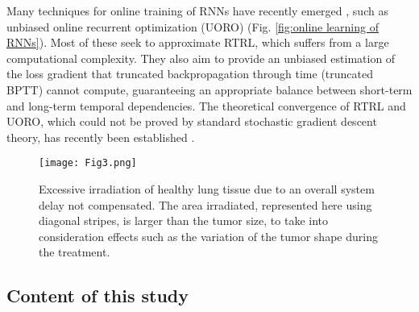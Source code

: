 \documentclass[twocolumn,a4paper]{svjour3} \sloppy          \smartqed
\begin{document}
Many techniques for online training of RNNs have recently emerged \cite{ollivier2015training, tallec2017unbiasing, jaderberg2017decoupled, mujika2018approximating, roth2018kernel, benzing2019optimal, murray2019local, aicher2020adaptively, menick2020practical, marschall2020unified, bohnstingl2020online}, such as unbiased online recurrent optimization (UORO) \cite{tallec2017unbiased} (Fig. \ref{fig:online learning of RNNs}). Most of these seek to approximate RTRL, which suffers from a large computational complexity. They also aim to provide an unbiased estimation of the loss gradient that truncated backpropagation through time (truncated BPTT) \cite{jaeger2002tutorial} cannot compute, guaranteeing an appropriate balance between short-term and long-term temporal dependencies. The theoretical convergence of RTRL and UORO, which could not be proved by standard stochastic gradient descent theory, has recently been established \cite{masse2020convergence}.



\begin{figure}[htb!]
\centering
\texttt{[image: Fig3.png]}
\caption{Excessive irradiation of healthy lung tissue due to an overall system delay  not compensated. The area irradiated, represented here using diagonal stripes, is larger than the tumor size, to take into consideration effects such as the variation of the tumor shape during the treatment\protect\footnotemark .} \label{fig:irradiation delay}
\end{figure}



\subsection{Content of this study}
\end{document}
